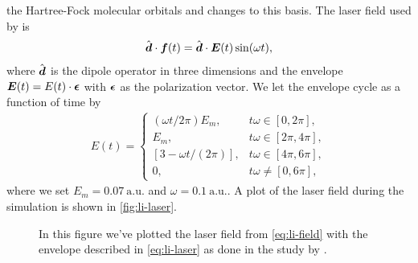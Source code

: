             the Hartree-Fock molecular orbitals and changes to this basis.
            The laser field used by \citeauthor{li_2005} is
            \begin{align}
                \hat{\boldsymbol{d}} \cdot \boldsymbol{f}(t)
                = \hat{\boldsymbol{d}} \cdot \boldsymbol{E}(t)\sin(\omega t),
                \label{eq:li-field}
            \end{align}
            where $\hat{\boldsymbol{d}}$ is the dipole operator in three dimensions and
            the envelope $\boldsymbol{E}(t) = E(t) \cdot \boldsymbol{\epsilon}$ with
            $\boldsymbol{\epsilon}$ as the polarization vector.
            We let the envelope cycle as a function of time by
            \begin{align}
                E(t) = \begin{cases}
                    (\omega t / 2\pi) E_m, & t\omega \in [0, 2\pi], \\
                    E_m, & t\omega \in [2\pi, 4\pi], \\
                    [3 - \omega t / (2\pi)], & t\omega \in [4\pi, 6\pi], \\
                    0, & t\omega \neq [0, 6\pi],
                \end{cases}
                \label{eq:li-laser}
            \end{align}
            where we set $E_m = \SI{0.07}{\text{a.u.}}$ and $\omega =
            \SI{0.1}{\text{a.u.}}$.
            A plot of the laser field during the simulation is shown in
            \autoref{fig:li-laser}.
            \begin{figure}
                \centering
                \caption{In this figure we've plotted the laser field from
                \autoref{eq:li-field} with the envelope described in
                \autoref{eq:li-laser} as done in the study by
                \citeauthor{li_2005} \cite{li_2005}.}
                \label{fig:li-laser}
            \end{figure}
